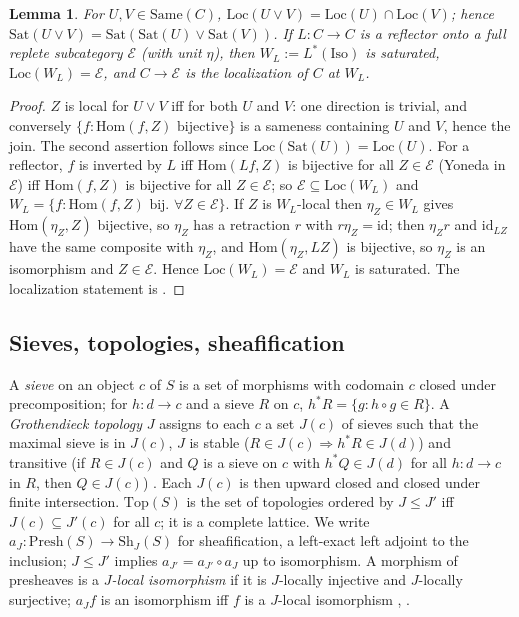 \documentclass[11pt]{amsart}
\newtheorem{lem}[thm]{Lemma}
\theoremstyle{definition}
\newcommand{\Same}{\mathrm{Same}}
\newcommand{\Top}{\mathrm{Top}}
\newcommand{\Iso}{\mathrm{Iso}}
\newcommand{\Presh}{\mathrm{Presh}}
\newcommand{\Sh}{\mathrm{Sh}}
\begin{document}
\begin{lem}\label{lem:loc}
For $U,V\in\Same(C)$, $\mathrm{Loc}(U\vee V)=\mathrm{Loc}(U)\cap\mathrm{Loc}(V)$;
hence $\mathrm{Sat}(U\vee V)=\mathrm{Sat}(\mathrm{Sat}(U)\vee\mathrm{Sat}(V))$.
If $L\colon C\to C$ is a reflector onto a full replete subcategory
$\mathcal E$ (with unit $\eta$), then $W_L:=L^*(\Iso)$ is saturated,
$\mathrm{Loc}(W_L)=\mathcal E$, and $C\to\mathcal E$ is the localization of
$C$ at $W_L$.
\end{lem}
\begin{proof}
$Z$ is local for $U\vee V$ iff for both $U$ and $V$: one direction is
trivial, and conversely $\{f:\mathrm{Hom}(f,Z)\text{ bijective}\}$ is a
sameness containing $U$ and $V$, hence the join. The second assertion follows
since $\mathrm{Loc}(\mathrm{Sat}(U))=\mathrm{Loc}(U)$. For a reflector, $f$ is
inverted by $L$ iff $\mathrm{Hom}(Lf,Z)$ is bijective for all $Z\in\mathcal
E$ (Yoneda in $\mathcal E$) iff $\mathrm{Hom}(f,Z)$ is bijective for all
$Z\in\mathcal E$; so $\mathcal E\subseteq\mathrm{Loc}(W_L)$ and
$W_L=\{f:\mathrm{Hom}(f,Z)\text{ bij.\ }\forall Z\in\mathcal E\}$. If $Z$ is
$W_L$-local then $\eta_Z\in W_L$ gives $\mathrm{Hom}(\eta_Z,Z)$ bijective, so
$\eta_Z$ has a retraction $r$ with $r\eta_Z=\mathrm{id}$; then $\eta_Z r$ and
$\mathrm{id}_{LZ}$ have the same composite with $\eta_Z$, and
$\mathrm{Hom}(\eta_Z,LZ)$ is bijective, so $\eta_Z$ is an isomorphism and
$Z\in\mathcal E$. Hence $\mathrm{Loc}(W_L)=\mathcal E$ and $W_L$ is saturated.
The localization statement is \cite[I.1.3]{GZ}.
\end{proof}

\subsection{Sieves, topologies, sheafification}
A \emph{sieve} on an object $c$ of $S$ is a set of morphisms with codomain $c$
closed under precomposition; for $h\colon d\to c$ and a sieve $R$ on $c$,
$h^*R=\{g: h\circ g\in R\}$. A \emph{Grothendieck topology} $J$ assigns to each
$c$ a set $J(c)$ of sieves such that the maximal sieve is in $J(c)$, $J$ is
stable ($R\in J(c)\Rightarrow h^*R\in J(d)$) and transitive (if $R\in J(c)$ and
$Q$ is a sieve on $c$ with $h^*Q\in J(d)$ for all $h\colon d\to c$ in $R$, then
$Q\in J(c)$) \cite{MLM}. Each $J(c)$ is then upward closed and closed under
finite intersection. $\Top(S)$ is the set of topologies ordered by $J\le J'$
iff $J(c)\subseteq J'(c)$ for all $c$; it is a complete lattice. We write
$a_J\colon\Presh(S)\to\Sh_J(S)$ for sheafification, a left-exact left adjoint to
the inclusion; $J\le J'$ implies $a_{J'}=a_{J'}\circ a_J$ up to isomorphism.
A morphism of presheaves is a \emph{$J$-local isomorphism} if it is $J$-locally
injective and $J$-locally surjective; $a_J f$ is an isomorphism iff $f$ is a
$J$-local isomorphism \cite[III.7]{MLM}, \cite[C2.2]{Elephant}.
\end{document}
